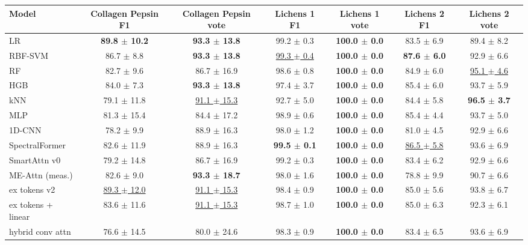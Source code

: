 \small
\begin{tabular}{lcccccc}
\toprule
Model & Collagen Pepsin F1 & Collagen Pepsin vote & Lichens 1 F1 & Lichens 1 vote & Lichens 2 F1 & Lichens 2 vote \\
\midrule
LR & \textbf{89.8 $\pm$ 10.2} & \textbf{93.3 $\pm$ 13.8} & 99.2 $\pm$ 0.3 & \textbf{100.0 $\pm$ 0.0} & 83.5 $\pm$ 6.9 & 89.4 $\pm$ 8.2 \\
RBF-SVM & 86.7 $\pm$ 8.8 & \textbf{93.3 $\pm$ 13.8} & \underline{99.3 $\pm$ 0.4} & \textbf{100.0 $\pm$ 0.0} & \textbf{87.6 $\pm$ 6.0} & 92.9 $\pm$ 6.6 \\
RF & 82.7 $\pm$ 9.6 & 86.7 $\pm$ 16.9 & 98.6 $\pm$ 0.8 & \textbf{100.0 $\pm$ 0.0} & 84.9 $\pm$ 6.0 & \underline{95.1 $\pm$ 4.6} \\
HGB & 84.0 $\pm$ 7.3 & \textbf{93.3 $\pm$ 13.8} & 97.4 $\pm$ 3.7 & \textbf{100.0 $\pm$ 0.0} & 85.4 $\pm$ 6.0 & 93.7 $\pm$ 5.9 \\
kNN & 79.1 $\pm$ 11.8 & \underline{91.1 $\pm$ 15.3} & 92.7 $\pm$ 5.0 & \textbf{100.0 $\pm$ 0.0} & 84.4 $\pm$ 5.8 & \textbf{96.5 $\pm$ 3.7} \\
MLP & 81.3 $\pm$ 15.4 & 84.4 $\pm$ 17.2 & 98.9 $\pm$ 0.6 & \textbf{100.0 $\pm$ 0.0} & 85.4 $\pm$ 4.4 & 93.7 $\pm$ 5.0 \\
1D-CNN & 78.2 $\pm$ 9.9 & 88.9 $\pm$ 16.3 & 98.0 $\pm$ 1.2 & \textbf{100.0 $\pm$ 0.0} & 81.0 $\pm$ 4.5 & 92.9 $\pm$ 6.6 \\
SpectralFormer & 82.6 $\pm$ 11.9 & 88.9 $\pm$ 16.3 & \textbf{99.5 $\pm$ 0.1} & \textbf{100.0 $\pm$ 0.0} & \underline{86.5 $\pm$ 5.8} & 93.6 $\pm$ 6.9 \\
\midrule
SmartAttn v0 & 79.2 $\pm$ 14.8 & 86.7 $\pm$ 16.9 & 99.2 $\pm$ 0.3 & \textbf{100.0 $\pm$ 0.0} & 83.4 $\pm$ 6.2 & 92.9 $\pm$ 6.6 \\
ME-Attn (meas.) & 82.6 $\pm$ 9.0 & \textbf{93.3 $\pm$ 18.7} & 98.0 $\pm$ 1.6 & \textbf{100.0 $\pm$ 0.0} & 78.8 $\pm$ 9.9 & 90.7 $\pm$ 6.6 \\
ex tokens v2 & \underline{89.3 $\pm$ 12.0} & \underline{91.1 $\pm$ 15.3} & 98.4 $\pm$ 0.9 & \textbf{100.0 $\pm$ 0.0} & 85.0 $\pm$ 5.6 & 93.8 $\pm$ 6.7 \\
ex tokens + linear & 83.6 $\pm$ 11.6 & \underline{91.1 $\pm$ 15.3} & 98.7 $\pm$ 1.0 & \textbf{100.0 $\pm$ 0.0} & 85.0 $\pm$ 6.3 & 92.3 $\pm$ 6.1 \\
hybrid conv attn & 76.6 $\pm$ 14.5 & 80.0 $\pm$ 24.6 & 98.3 $\pm$ 0.9 & \textbf{100.0 $\pm$ 0.0} & 83.4 $\pm$ 6.5 & 93.6 $\pm$ 6.9 \\
\bottomrule
\end{tabular}

